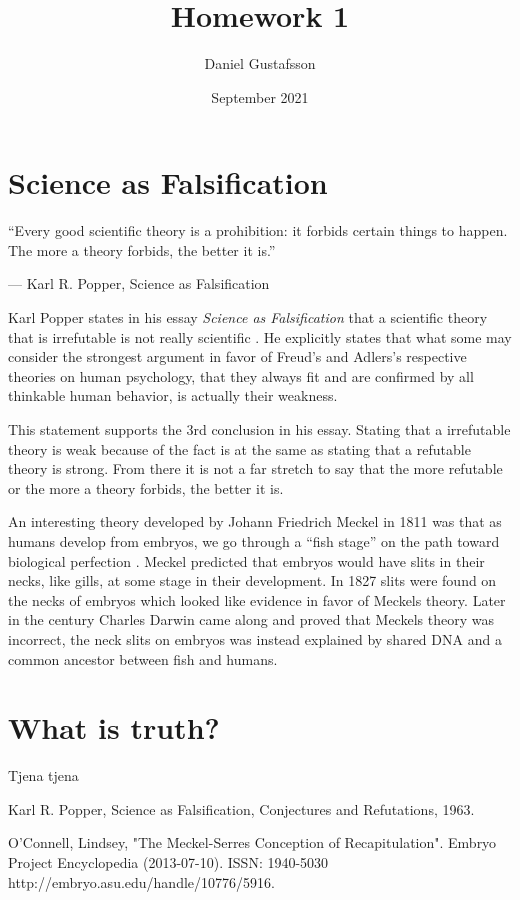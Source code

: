 \documentclass[11pt,a4paper]{article}
\begin{document}
\title{Homework 1}
\author{Daniel Gustafsson}
\date{September 2021}
\maketitle
	
\section{Science as Falsification}
\epigraph{``Every good scientific theory is a prohibition: it forbids certain things to happen. The more a theory forbids, the better it is.''}{--- \textup{Karl R. Popper}, Science as Falsification}

Karl Popper states in his essay \textit{Science as Falsification} that a scientific theory that is irrefutable is not really scientific \cite{saf}.
He explicitly states that what some may consider the strongest argument in favor of Freud's and Adlers's respective theories on human psychology,
that they always fit and are confirmed by all thinkable human behavior, is actually their weakness.

This statement supports the 3rd conclusion in his essay. 
Stating that a irrefutable theory is weak because of the fact is at the same as stating that a refutable theory is strong.
From there it is not a far stretch to say that the more refutable or the more a theory forbids, the better it is.

An interesting theory developed by Johann Friedrich Meckel in 1811 was that as humans develop from embryos, we go through a ``fish stage'' on the
path toward biological perfection \cite{fish}. Meckel predicted that embryos would have slits in their necks, like gills, at some stage in their development.
In 1827 slits were found on the necks of embryos which looked like evidence in favor of Meckels theory.
Later in the century Charles Darwin came along and proved that Meckels theory was incorrect, the neck slits on embryos was instead explained by 
shared DNA and a common ancestor between fish and humans. 

\section{What is truth?}
Tjena tjena

\begin{thebibliography}{9}

	Karl R. Popper,
	Science as Falsification,
	Conjectures and Refutations,
	1963.

	O'Connell, Lindsey, "The Meckel-Serres Conception of Recapitulation". 
	Embryo Project Encyclopedia (2013-07-10).
	ISSN: 1940-5030 http://embryo.asu.edu/handle/10776/5916.

\end{thebibliography}
\end{document}
